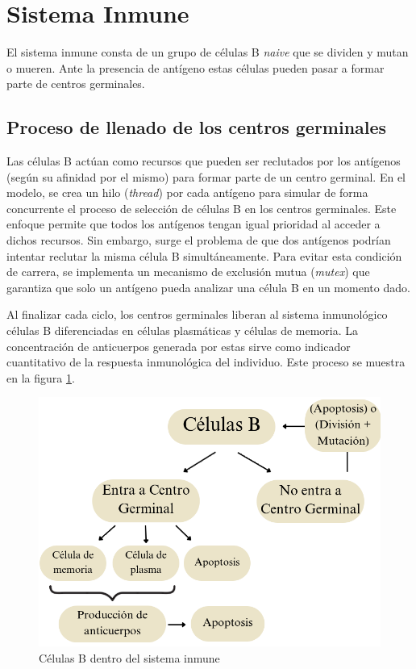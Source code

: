 \section{Sistema Inmune}

El sistema inmune consta de un grupo de células B \textit{naive} que se dividen y mutan o mueren. Ante la presencia de antígeno estas células pueden pasar a formar parte de centros germinales. 

\subsection*{Proceso de llenado de los centros germinales}
Las células B actúan como recursos que pueden ser reclutados por los antígenos (según su afinidad por el mismo) para formar parte de un centro germinal. En el modelo, se crea un hilo (\textit{thread}) por cada antígeno para simular de forma concurrente el proceso de selección de células B en los centros germinales. Este enfoque permite que todos los antígenos tengan igual prioridad al acceder a dichos recursos. Sin embargo, surge el problema de que dos antígenos podrían intentar reclutar la misma célula B simultáneamente. Para evitar esta condición de carrera, se implementa un mecanismo de exclusión mutua (\textit{mutex}) que garantiza que solo un antígeno pueda analizar una célula B en un momento dado.

Al finalizar cada ciclo, los centros germinales liberan al sistema inmunológico células B diferenciadas en células plasmáticas y células de memoria. La concentración de anticuerpos generada por estas sirve como indicador cuantitativo de la respuesta inmunológica del individuo. Este proceso se muestra en la figura \ref{fig:is}.

\begin{figure}[H] %
    \centering
    \includegraphics[width=1\textwidth]{Graphics/is.png}
    \caption{Células B dentro del sistema inmune}
    \label{fig:is}
\end{figure}

